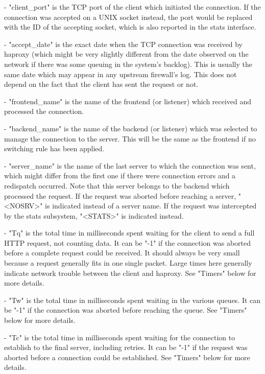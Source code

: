   - "client_port" is the TCP port of the client which initiated the connection.
    If the connection was accepted on a UNIX socket instead, the port would be
    replaced with the ID of the accepting socket, which is also reported in the
    stats interface.

  - "accept_date" is the exact date when the TCP connection was received by
    haproxy (which might be very slightly different from the date observed on
    the network if there was some queuing in the system's backlog). This is
    usually the same date which may appear in any upstream firewall's log. This
    does not depend on the fact that the client has sent the request or not.

  - "frontend_name" is the name of the frontend (or listener) which received
    and processed the connection.

  - "backend_name" is the name of the backend (or listener) which was selected
    to manage the connection to the server. This will be the same as the
    frontend if no switching rule has been applied.

  - "server_name" is the name of the last server to which the connection was
    sent, which might differ from the first one if there were connection errors
    and a redispatch occurred. Note that this server belongs to the backend
    which processed the request. If the request was aborted before reaching a
    server, "<NOSRV>" is indicated instead of a server name. If the request was
    intercepted by the stats subsystem, "<STATS>" is indicated instead.

  - "Tq" is the total time in milliseconds spent waiting for the client to send
    a full HTTP request, not counting data. It can be "-1" if the connection
    was aborted before a complete request could be received. It should always
    be very small because a request generally fits in one single packet. Large
    times here generally indicate network trouble between the client and
    haproxy. See "Timers" below for more details.

  - "Tw" is the total time in milliseconds spent waiting in the various queues.
    It can be "-1" if the connection was aborted before reaching the queue.
    See "Timers" below for more details.

  - "Tc" is the total time in milliseconds spent waiting for the connection to
    establish to the final server, including retries. It can be "-1" if the
    request was aborted before a connection could be established. See "Timers"
    below for more details.

